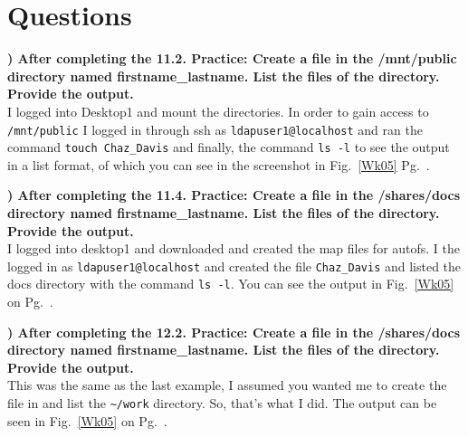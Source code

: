 \documentclass{report}
\title{\classinfo}
\author{\semester}
\date{\today}
\newcommand{\mysection}[1]{\section*{#1}}
\newcommand{\mysubsection}[2]{\textbf{\romannumeral #1) #2}}
\begin{document}
\maketitle

\mysection{\textbf{Questions}}

\mysubsection{1}{After completing the 11.2. Practice: Create a file in the /mnt/public directory named 
firstname\_lastname. List the files of the directory. Provide the output.}\\
I logged into Desktop1 and mount the directories. In order to gain access to
{\scriptsize{\verb$/mnt/public$}\normalsize}  I logged in through ssh as
{\scriptsize{\verb$ldapuser1@localhost$}\normalsize} and ran the
command {\scriptsize{\verb$touch Chaz_Davis$}\normalsize} and finally, the
command {\scriptsize{\verb$ls -l$}\normalsize} to see the output
in a list format, of which you can see in the screenshot in
Fig.~\ref{Wk05} Pg.~\pageref{Wk05}.

\noindent\mysubsection{2}{After completing the 11.4. Practice: Create a file in the /shares/docs directory named 
firstname\_lastname. List the files of the directory. Provide the output.}\\
I logged into desktop1 and downloaded and created the map files for autofs. I
the logged in as {\scriptsize{\verb$ldapuser1@localhost$}\normalsize} and
created the file {\scriptsize{\verb$Chaz_Davis$}\normalsize} and listed the
docs directory with the command {\scriptsize{\verb$ls -l$}\normalsize}. You can
see the output in Fig.~\ref{Wk05}~ 
on Pg.~\pageref{Wk05}.

\noindent\mysubsection{3}{After completing the 12.2. Practice: Create a file in
the /shares/docs directory named firstname\_lastname. List the files of the
directory. Provide the output.}\\
This was the same as the last example, I assumed you wanted me to create the
file in and list the {\scriptsize{\verb$~/work$}\normalsize} directory. So,
that's what I did. The output can be seen in Fig.~\ref{Wk05} on
Pg.~\pageref{Wk05}.
\end{document}
